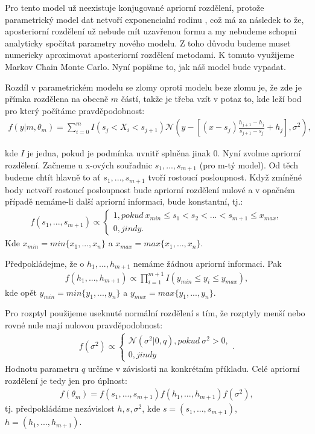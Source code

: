 \documentclass[czech,master,public,dept470,male,cpdeclaration,oneside, python]{diploma}
\begin{document}
\par
Pro tento model už neexistuje konjugované apriorní rozdělení, protože parametrický model dat netvoří exponencialní rodinu \cite{robert2007bayesian}, což má za následek to že, aposteriorní rozdělení už nebude mít uzavřenou formu a my nebudeme schopni analyticky spočítat parametry nového modelu. Z toho důvodu budeme muset numericky aproximovat aposteriorní rozdělení metodami. K tomuto využijeme Markov Chain Monte Carlo\cite{robert2004monte}. Nyní popišme to, jak náš model bude vypadat. \par
Rozdíl v parametrickém modelu se zlomy oproti modelu beze zlomu je, že zde je přímka rozdělena na obecně $m$ částí, takže je třeba vzít v potaz to, kde leží bod pro který počítáme pravděpodobnost:
\begin{align}\label{parameticky_model}
f(y | m, \theta_m) = \sum_{i=0}^{m} I(s_j < X_i < s_{j+1}) 
\mathcal{N}(y - [(x - s_j)\frac{h_{j+1} - h_j}{s_{j+1} - s_j} + h_j], \sigma^2),
\end{align} \par
kde $I$ je jedna, pokud je podmínka uvnitř splněna jinak 0. Nyní zvolme apriorní rozdělení. Začneme u x-ových souřadnic $s_1, ..., s_{m+1}$ (pro m-tý model). Od těch budeme chtít hlavně to ať $s_1, ..., s_{m+1}$ tvoří rostoucí posloupnost. Když zmíněné body netvoří rostoucí posloupnost bude apriorní rozdělení nulové a v opačném případě nemáme-li další apriorní informaci, bude konstantní, tj.:
\begin{align}\nonumber
f(s_1, ..., s_{m+1}) \propto
	\begin{cases}
		1, pokud\ x_{min} \leq s_1 < s_2 < ... < s_{m+1} \leq x_{max}, \\
		0, jindy.		
	\end{cases}
\end{align}
Kde $x_{min} = min\{x_1, ..., x_n\}$ a $x_{max} = max\{x_1, ..., x_n\}$. \par
Předpokládejme, že o $h_1, ..., h_{m+1}$ nemáme žádnou apriorní informaci. Pak
\begin{align}\nonumber
f(h_1,..., h_{m+1}) \propto \prod_{i=1}^{m+1} I(y_{min} \leq y_i \leq y_{max}),
\end{align}
kde opět $y_{min} = min\{y_1, ..., y_n\}$ a $y_{max} = max\{y_1, ..., y_n\}$. \par
Pro rozptyl použijeme useknuté normální rozdělení s tím, že rozptyly menší nebo rovné nule mají nulovou pravděpodobnost:
\begin{align}\nonumber
f(\sigma^2) \propto 
\begin{cases}
\mathcal{N}(\sigma^2 | 0, q), pokud\  \sigma^2 > 0, \\
0, jindy
\end{cases}.
\end{align}
Hodnotu parametru $q$ určíme v závislosti na konkrétním příkladu.
Celé apriorní rozdělení je tedy jen pro úplnost:
\begin{align}\label{apriorni}
f(\theta_m) = f(s_1, ..., s_{m+1})f(h_1,..., h_{m+1})f(\sigma^2),
\end{align}
tj. předpokládáme nezávislost $h,s,\sigma^2$, kde $s=(s_1, ..., s_{m+1})$, $h=(h_1,..., h_{m+1})$. \par
\end{document}
